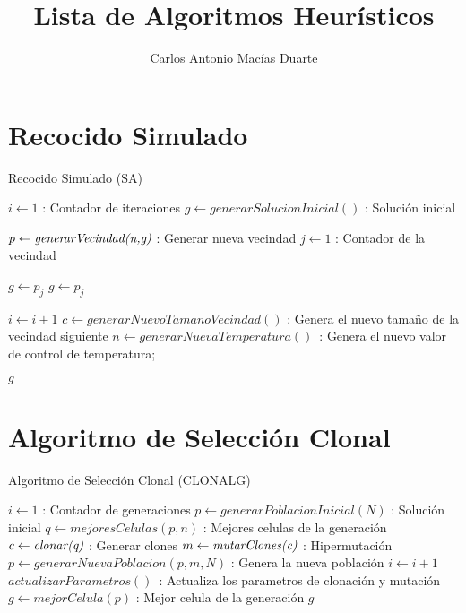 \documentclass[10pt,letterpaper,twoside,openright]{article}
\author{Carlos Antonio Macías Duarte}
\title{Lista de Algoritmos Heurísticos}
\begin{document}
	\maketitle
			
	\section{Recocido Simulado}
	
		\begin{algorithm}[H]
			\caption{Recocido Simulado (SA)}
				$ i \leftarrow 1 $ : Contador de iteraciones\;
				$ g \leftarrow generarSolucionInicial() $ : Solución inicial\;
				{
					$ p \leftarrow \emph{generarVecindad(n,g)}$ : Generar nueva vecindad\;
					$ j \leftarrow 1 $ : Contador de la vecindad\;
					{
						{
							$ g \leftarrow p_{j} $\;
						}
						{
							$ g \leftarrow p_{j} $\;
						}
						
					}			
					$ i \leftarrow  i + 1 $\;
					$ c \leftarrow  generarNuevoTamanoVecindad() $ : Genera el nuevo tamaño de la vecindad siguiente\;
					$ n \leftarrow  generarNuevaTemperatura() $\ :  Genera el nuevo valor de control de temperatura;
				}
		 		\Return $ g $
		 \end{algorithm}
		 
			
	\section{Algoritmo de Selección Clonal}
	
		\begin{algorithm}[H]
			\caption{Algoritmo de Selección Clonal (CLONALG)}
				$ i \leftarrow 1 $ : Contador de generaciones\;
				$ p \leftarrow generarPoblacionInicial(N) $ : Solución inicial\;
				{
					$ q \leftarrow mejoresCelulas(p, n) $ : Mejores celulas de la generación\;
					$ c \leftarrow \emph{clonar(q)}$ : Generar clones\;
					$ m \leftarrow \emph{mutarClones(c)}$ : Hipermutación\;
					$ p \leftarrow  generarNuevaPoblacion(p, m, N) $ : Genera la nueva población\;
					$ i \leftarrow  i + 1 $\;
					$actualizarParametros() $\ :  Actualiza los parametros de clonación y mutación\;
					$ g \leftarrow mejorCelula(p) $ : Mejor celula de la generación\;
				}
		 		\Return $ g $
		 \end{algorithm}
	
\end{document}
